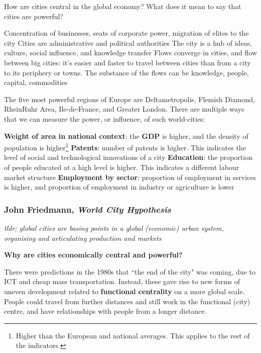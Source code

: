 \documentclass{article}
\begin{document}
How are cities central in the global economy? What does it mean to say that cities are powerful? 

\begin{outline}
	\1 Concentration of businesses, seats of corporate power, migration of elites to the city
	\1 Cities are administrative and political authorities
	\1 The city is a hub of ideas, culture, social influence, and knowledge transfer
	\1 Flows converge in cities, and flow between big cities: it's easier and faster to travel between cities than from a city to its periphery or towns. The substance of the flows can be knowledge, people, capital, commodities
\end{outline}

The five most powerful regions of Europe are Deltametropolis, Flemish Diamond, RheinRuhr Area, Ile-de-France, and Greater London.
There are multiple ways that we can measure the power, or influence, of such world-cities:

\begin{outline}
	\1 \textbf{Weight of area in national context}: the \textbf{GDP} is higher, and the density of population is higher\footnote{Higher than the European and national averages. This applies to the rest of the indicators.}
	\1 \textbf{Patents}: number of patents is higher. This indicates the level of social and technological innovations of a city
	\1 \textbf{Education}: the proportion of people educated at a high level is higher. This indicates a different labour market structure
	\1 \textbf{Employment by sector}: proportion of employment in services is higher, and proportion of employment in industry or agriculture is lower
\end{outline}

\subsubsection{John Friedmann, \textit{World City Hypothesis}}

\textit{tldr; global cities are basing points in a global (economic) urban system, organising and articulating production and markets}

\textbf{Why are cities economically central and powerful?}

There were predictions in the 1980s that ``the end of the city" was coming, due to ICT and cheap mass transportation. Instead, these gave rise to new forms of uneven development related to \textbf{functional centrality} on a more global scale. People could travel from further distances and still work in the functional (city) centre, and have relationships with people from a longer distance.
\end{document}
